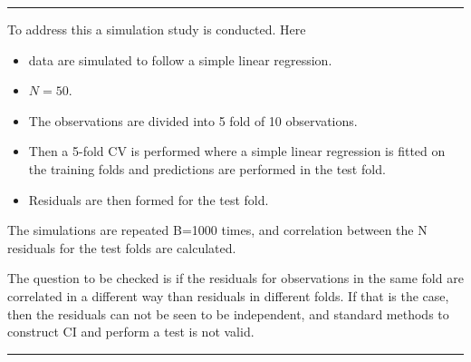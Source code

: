 \documentclass[
  letterpaper,
  DIV=11,
  numbers=noendperiod]{scrartcl}
\providecommand{\tightlist}{%
  \setlength{\itemsep}{0pt}\setlength{\parskip}{0pt}}\usepackage{longtable,booktabs,array}
\begin{document}
\begin{center}\rule{0.5\linewidth}{0.5pt}\end{center}

To address this a simulation study is conducted. Here

\begin{itemize}
\tightlist
\item
  data are simulated to follow a simple linear regression.
\item
  \(N=50\).
\item
  The observations are divided into 5 fold of 10 observations.
\item
  Then a 5-fold CV is performed where a simple linear regression is
  fitted on the training folds and predictions are performed in the test
  fold.
\item
  Residuals are then formed for the test fold.
\end{itemize}

The simulations are repeated B=1000 times, and correlation between the N
residuals for the test folds are calculated.

The question to be checked is if the residuals for observations in the
same fold are correlated in a different way than residuals in different
folds. If that is the case, then the residuals can not be seen to be
independent, and standard methods to construct CI and perform a test is
not valid.

\begin{center}\rule{0.5\linewidth}{0.5pt}\end{center}
\end{document}
